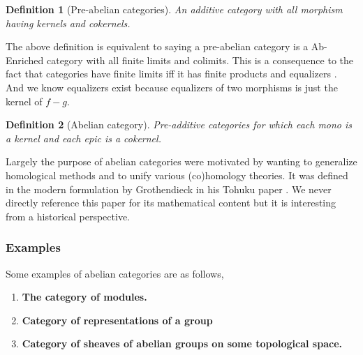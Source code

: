\documentclass[12pt]{article}
\numberwithin{equation}{section}
\newtheorem{definition}{Definition}[section]
\begin{document}
\begin{appendices}
	
	\begin{definition}[Pre-abelian categories]
		An additive category with all morphism having kernels and cokernels.
	\end{definition}
	The above definition is equivalent to saying a pre-abelian category is a Ab-Enriched category with all finite limits and colimits. This is a consequence to the fact that categories have finite limits iff it has finite products and equalizers \cite[Prop.~5.21]{Awodey}. And we know equalizers exist because equalizers of two morphisms is just the kernel of $f-g$.
	
	
	
	
	\begin{definition}[Abelian category]
		Pre-additive categories for which each mono is a kernel and each epic is a cokernel.
	\end{definition}
	Largely the purpose of abelian categories were motivated by wanting to generalize homological methods and to unify various (co)homology theories. It was defined in the modern formulation by Grothendieck in his Tohuku paper \cite{grothendieck1957quelques}. We never directly reference this paper for its mathematical content but it is interesting from a historical perspective.
	\subsubsection{Examples}
	Some examples of abelian categories are as follows,
	\begin{enumerate}
		\item \textbf{The category of modules.}
		\item\textbf{Category of representations of a group}
		\item \textbf{Category of sheaves of abelian groups on some topological space.}
		

\end{enumerate}
\end{appendices}
\end{document}
